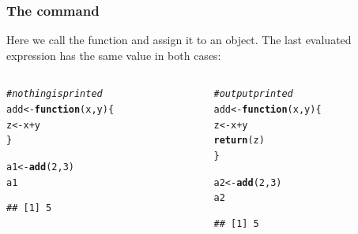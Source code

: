 \documentclass[12pt]{beamer}\usepackage[]{graphicx}\usepackage[]{color}
\makeatletter
\newcommand{\hlnum}[1]{\textcolor[rgb]{0.686,0.059,0.569}{#1}}%
\newcommand{\hlcom}[1]{\textcolor[rgb]{0.678,0.584,0.686}{\textit{#1}}}%
\newcommand{\hlopt}[1]{\textcolor[rgb]{0,0,0}{#1}}%
\newcommand{\hlstd}[1]{\textcolor[rgb]{0.345,0.345,0.345}{#1}}%
\newcommand{\hlkwa}[1]{\textcolor[rgb]{0.161,0.373,0.58}{\textbf{#1}}}%
\newcommand{\hlkwb}[1]{\textcolor[rgb]{0.69,0.353,0.396}{#1}}%
\newcommand{\hlkwc}[1]{\textcolor[rgb]{0.333,0.667,0.333}{#1}}%
\newcommand{\hlkwd}[1]{\textcolor[rgb]{0.737,0.353,0.396}{\textbf{#1}}}%
\newenvironment{kframe}{%
 \def\at@end@of@kframe{}%
 \ifinner\ifhmode%
  \def\at@end@of@kframe{\end{minipage}}%
  \begin{minipage}{\columnwidth}%
 \fi\fi%
 \def\FrameCommand##1{\hskip\@totalleftmargin \hskip-\fboxsep
 \colorbox{shadecolor}{##1}\hskip-\fboxsep
     \hskip-\linewidth \hskip-\@totalleftmargin \hskip\columnwidth}%
 \MakeFramed {\advance\hsize-\width
   \@totalleftmargin\z@ \linewidth\hsize
   \@setminipage}}%
 {\par\unskip\endMakeFramed%
 \at@end@of@kframe}
\newenvironment{knitrout}{}{} %
\makeatother
\begin{document}
\begin{frame}[fragile]
\frametitle{The  command}

Here we call the function and assign it to an object. The last evaluated expression has the same value in both cases:

\begin{columns}[t]
\begin{column}{0.45\textwidth}
\begin{knitrout}\footnotesize
{}\color{fgcolor}\begin{kframe}
\begin{alltt}
\hlcom{# nothing is printed}
\hlstd{add} \hlkwb{<-} \hlkwa{function}\hlstd{(}\hlkwc{x}\hlstd{,} \hlkwc{y}\hlstd{) \{}
  \hlstd{z} \hlkwb{<-} \hlstd{x} \hlopt{+} \hlstd{y}
\hlstd{\}}

\hlstd{a1} \hlkwb{<-} \hlkwd{add}\hlstd{(}\hlnum{2}\hlstd{,} \hlnum{3}\hlstd{)}
\hlstd{a1}
\end{alltt}
\begin{verbatim}
## [1] 5
\end{verbatim}
\end{kframe}
\end{knitrout}
\end{column}

\begin{column}{0.45\textwidth}
\begin{knitrout}\footnotesize
{}\color{fgcolor}\begin{kframe}
\begin{alltt}
\hlcom{# output printed}
\hlstd{add} \hlkwb{<-} \hlkwa{function}\hlstd{(}\hlkwc{x}\hlstd{,} \hlkwc{y}\hlstd{) \{}
  \hlstd{z} \hlkwb{<-} \hlstd{x} \hlopt{+} \hlstd{y}
  \hlkwd{return}\hlstd{(z)}
\hlstd{\}}

\hlstd{a2} \hlkwb{<-} \hlkwd{add}\hlstd{(}\hlnum{2}\hlstd{,} \hlnum{3}\hlstd{)}
\hlstd{a2}
\end{alltt}
\begin{verbatim}
## [1] 5
\end{verbatim}
\end{kframe}
\end{knitrout}
\end{column}
\end{columns}

\end{frame}

\end{document}
